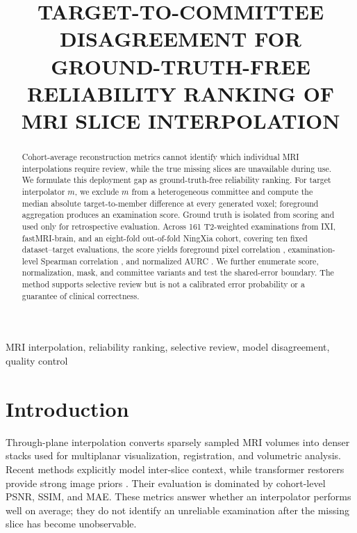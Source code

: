 \documentclass{article}
\title{TARGET-TO-COMMITTEE DISAGREEMENT FOR GROUND-TRUTH-FREE\\
RELIABILITY RANKING OF MRI SLICE INTERPOLATION}
\begin{document}
\ninept
\maketitle

\begin{abstract}
Cohort-average reconstruction metrics cannot identify which individual MRI interpolations require review, while the true missing slices are unavailable during use. We formulate this deployment gap as ground-truth-free reliability ranking. For target interpolator $m$, we exclude $m$ from a heterogeneous committee and compute the median absolute target-to-member difference at every generated voxel; foreground aggregation produces an examination score. Ground truth is isolated from scoring and used only for retrospective evaluation. Across 161 T2-weighted examinations from IXI, fastMRI-brain, and an eight-fold out-of-fold NingXia cohort, covering ten fixed dataset--target evaluations, the score yields foreground pixel correlation \PixelFisherRange, examination-level Spearman correlation \CaseSpearmanRange, and normalized AURC \NAURCRange. We further enumerate score, normalization, mask, and committee variants and test the shared-error boundary. The method supports selective review but is not a calibrated error probability or a guarantee of clinical correctness.
\end{abstract}

\begin{keywords}
MRI interpolation, reliability ranking, selective review, model disagreement, quality control
\end{keywords}

\section{Introduction}

Through-plane interpolation converts sparsely sampled MRI volumes into denser stacks used for multiplanar visualization, registration, and volumetric analysis. Recent methods explicitly model inter-slice context, while transformer restorers provide strong image priors \cite{song2024i3net,liang2021swinir,chen2022hat}. Their evaluation is dominated by cohort-level PSNR, SSIM, and MAE. These metrics answer whether an interpolator performs well on average; they do not identify an unreliable examination after the missing slice has become unobservable.
\end{document}
